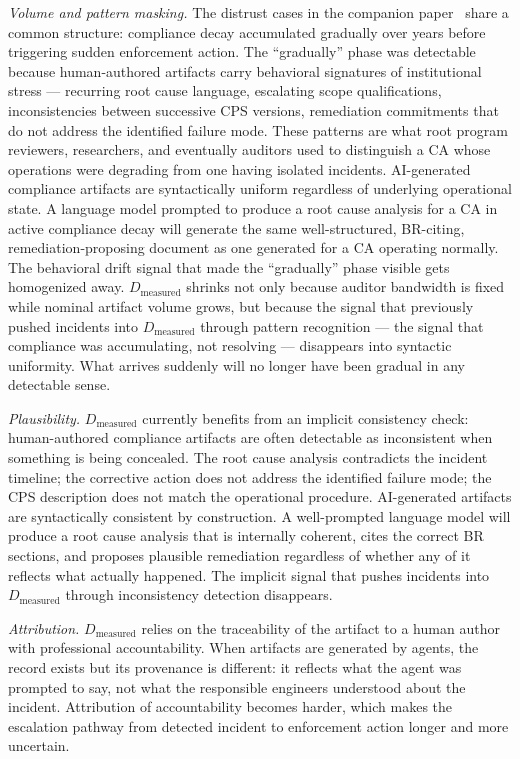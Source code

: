 \documentclass[10pt,twocolumn,letterpaper]{article}
\begin{document}
\textit{Volume and pattern masking.} The distrust cases in the companion
paper~\cite{sister} share a common structure: compliance decay accumulated
gradually over years before triggering sudden enforcement action. The
``gradually'' phase was detectable because human-authored artifacts carry
behavioral signatures of institutional stress --- recurring root cause
language, escalating scope qualifications, inconsistencies between
successive CPS versions, remediation commitments that do not address
the identified failure mode. These patterns are what root program
reviewers, researchers, and eventually auditors used to distinguish a
CA whose operations were degrading from one having isolated incidents.
AI-generated compliance artifacts are syntactically uniform regardless
of underlying operational state. A language model prompted to produce
a root cause analysis for a CA in active compliance decay will generate
the same well-structured, BR-citing, remediation-proposing document as
one generated for a CA operating normally. The behavioral drift signal
that made the ``gradually'' phase visible gets homogenized away.
$D_\text{measured}$ shrinks not only because auditor bandwidth is
fixed while nominal artifact volume grows, but because the signal
that previously pushed incidents into $D_\text{measured}$ through
pattern recognition --- the signal that compliance was accumulating,
not resolving --- disappears into syntactic uniformity. What arrives
suddenly will no longer have been gradual in any detectable sense.

\textit{Plausibility.} $D_\text{measured}$ currently benefits from
an implicit consistency check: human-authored compliance artifacts
are often detectable as inconsistent when something is being concealed.
The root cause analysis contradicts the incident timeline; the corrective
action does not address the identified failure mode; the CPS description
does not match the operational procedure. AI-generated artifacts are
syntactically consistent by construction. A well-prompted language model
will produce a root cause analysis that is internally coherent, cites
the correct BR sections, and proposes plausible remediation regardless
of whether any of it reflects what actually happened. The implicit
signal that pushes incidents into $D_\text{measured}$ through
inconsistency detection disappears.

\textit{Attribution.} $D_\text{measured}$ relies on the traceability
of the artifact to a human author with professional accountability.
When artifacts are generated by agents, the record exists but its
provenance is different: it reflects what the agent was prompted to
say, not what the responsible engineers understood about the incident.
Attribution of accountability becomes harder, which makes the
escalation pathway from detected incident to enforcement action
longer and more uncertain.
\end{document}
